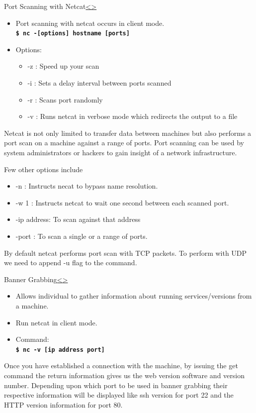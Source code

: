 \documentclass[12pt]{extarticle}
\newcommand{\code}[1]{\texttt{\bfseries#1}}
\newenvironment{instructionblock}{\Large\bgroup}{\egroup}
\newcommand{\bi}{\begin{itemize}}
\newcommand{\ei}{\end{itemize}}
\begin{document}
\pagebreak
\begin{slide}{Port Scanning with Netcat}{\hyperref[slide 16]{\textless}\hyperref[slide 18]{\textgreater}}
\vskip 5pt
\begin{instructionblock}
\begin{itemize}
\item Port scanning with netcat occurs in client mode.\\
	\code{\$ nc -[options] hostname [ports]}
\item Options:
\bi
\item -z : Speed up your scan
\item -i : Sets a delay interval between ports scanned
\item -r : Scans port randomly
\item -v : Runs netcat in verbose mode which redirects the output to a file
\ei
\end{itemize}
\end{instructionblock}
\end{slide}
Netcat is not only limited to transfer data between machines but also performs a port scan on a machine against a range of ports. Port scanning can be used by system administrators or hackers to gain insight of a network infrastructure.

Few other options include
\begin{itemize}
	\item -n : Instructs necat to bypass name resolution.
	\item -w 1 : Instructs netcat to wait one second between each scanned port.
	\item -ip address: To scan against that address
	\item -port : To scan a single or a range of ports.
\end{itemize}
By default netcat performs port scan with TCP packets. To perform with UDP we need to append -u flag to the command.
\cite{Inetcat} 
\pagebreak
\begin{slide}{Banner Grabbing}{\hyperref[slide 17]{\textless}\hyperref[slide 19]{\textgreater}}
\vskip 5pt
\begin{instructionblock}
\begin{itemize}
\item Allows individual to gather information about running services/versions from a machine. 
\item Run netcat in client mode.
\item Command:\\
	\code{\$ nc -v [ip address port]}
\end{itemize}
\end{instructionblock}
\end{slide}
Once you have established a connection with the machine, by issuing the get command the return information gives us the web version software and version number. Depending upon which port to be used in banner grabbing their respective information will be displayed like ssh version for port 22 and the HTTP version information for port 80. \cite{Inetcat} 
\end{document}
